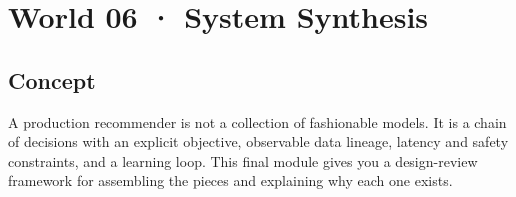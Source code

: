 \section{World 06 · System Synthesis}

\begin{abstract}
A production design is a chain of explicit contracts, measurements and failure plans, not a pile of models.
\end{abstract}

\subsection{Concept}
A production recommender is not a collection of fashionable models. It is a chain of decisions with an explicit objective, observable data lineage, latency and safety constraints, and a learning loop. This final module gives you a design-review framework for assembling the pieces and explaining why each one exists.
